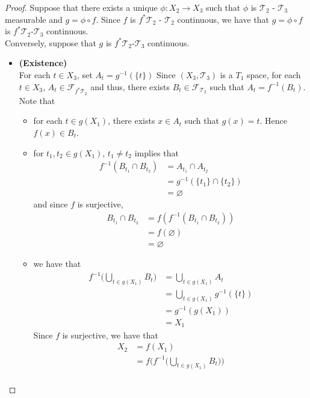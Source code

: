\documentclass[12pt]{amsart}
\theoremstyle{definition}
\newcommand{\MF}{\mathcal{F}}
\newcommand{\MT}{\mathcal{T}}
\newcommand{\tbf}[1]{\textbf{#1}}
\DeclareMathOperator*{\0}{\mbf{0}}
\DeclareMathOperator*{\1}{\mbf{1}}
\begin{document}
	\begin{proof}
	
	Suppose that there exists a unique $\phi: X_2 \rightarrow X_3$ such that $\phi$ is $\MT_2$ - $\MT_3$ measurable and $g = \phi \circ f$. Since $f$ is $f^* \MT_2$ - $\MT_2$ continuous, we have that $g = \phi \circ f$ is $f^*\MT_2$-$\MT_3$ continuous.  \\
	Conversely, suppose that $g$ is $f^*\MT_2$-$\MT_3$ continuous. \\
	\begin{itemize}
	\item \tbf{(Existence)} \\
	For each $t \in X_3$, set $A_t = g^{-1}(\{t\})$ Since $(X_3, \MT_3)$ is a $T_1$ space, for each $t \in X_3$, $A_t \in \MF_{f^*\MT_2}$ and thus, there exists $B_t \in \MF_{\MT_2}$ such that $A_t = f^{-1}(B_t)$. \\
	Note that 
	\begin{itemize}
	\item for each $t \in g(X_1)$, there exists $x \in A_t$ such that $g(x) = t$. Hence $f(x) \in B_t$.\\
	\item for $t_1, t_2 \in g(X_1)$, $t_1 \neq t_2$ implies that
	\begin{align*}
	f^{-1}(B_{t_1} \cap B_{t_2}) 
	&= A_{t_1} \cap A_{t_2} \\
	&= g^{-1}(\{t_1\} \cap \{t_2\}) \\
	&= \varnothing
	\end{align*}	 
	and since $f$ is surjective, 
	\begin{align*}
	B_{t_1} \cap  B_{t_2} 
	& = f(f^{-1}(B_{t_1} \cap  B_{t_2} )) \\
	&= f(\varnothing) \\
	&= \varnothing
	\end{align*}
	\item we have that 
	\begin{align*}
	f^{-1} \bigg( \bigcup_{t \in g(X_1)} B_t\bigg) 
	&=  \bigcup_{t \in g(X_1)} A_t \\
	&= \bigcup_{t \in g(X_1)} g^{-1}(\{t\}) \\
	&= g^{-1}(g(X_1)) \\
	&= X_1
	\end{align*}
	Since $f$ is surjective, we have that 
	\begin{align*}
	X_2
	&= f(X_1) \\
	&= f \bigg( f^{-1} \bigg( \bigcup_{t \in g(X_1)} B_t\bigg)  \bigg) \\

\end{align*}
\end{itemize}
\end{itemize}
\end{proof}
\end{document}
